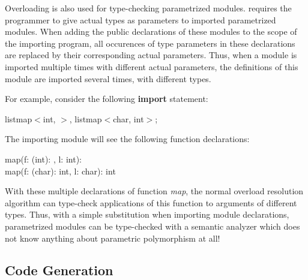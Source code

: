 Overloading is also used for type-checking parametrized modules.
\turtle{} requires the programmer to give actual types as parameters
to imported parametrized modules.  When adding the public declarations
of these modules to the scope of the importing program, all occurences
of type parameters in these declarations are replaced by their
corresponding actual parameters.  Thus, when a module is imported
multiple times with different actual parameters, the definitions of
this module are imported several times, with different types.

For example, consider the following {\bf import} statement:

\begin{ttlprog}
\>\ttlImport{} listmap$<$int, \ttlString{}$>$, listmap$<$char, int$>$;
\end{ttlprog}
%
The importing module will see the following function declarations:
%
\begin{ttlprog}
\>\ttlFun{} map(f: \ttlFun{}(int): \ttlString{}, l: \ttlList{} \ttlOf{} int): \ttlList{} \ttlOf{} \ttlString{}\\
\>\ttlFun{} map(f: \ttlFun{}(char): int, l: \ttlList{} \ttlOf{} char): \ttlList{} \ttlOf{} int
\end{ttlprog}
%
With these multiple declarations of function {\em map}, the normal
overload resolution algorithm can type-check applications of this
function to arguments of different types.  Thus, with a simple
substitution when importing module declarations, parametrized modules
can be type-checked with a semantic analyzer which does not know
anything about parametric polymorphism at all!

\subsection{Code Generation}
\label{sec:code-generation}


